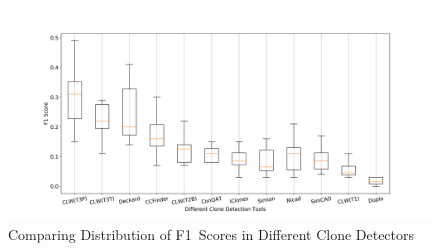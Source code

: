 \documentclass[review]{elsarticle}
\begin{document}
\begin{figure}
\centering
\includegraphics[width=\textwidth] {CochangeBoxFScoresRanked.png}
\caption{Comparing Distribution of F1~Scores in Different Clone Detectors}
\label{fig:CochangeBoxFScoresRanked}
\end{figure}
\end{document}
